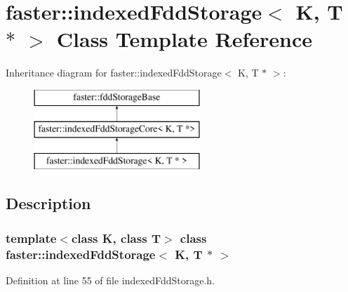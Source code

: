 \hypertarget{classfaster_1_1indexedFddStorage_3_01K_00_01T_01_5_01_4}{}\section{faster\+:\+:indexed\+Fdd\+Storage$<$ K, T $\ast$ $>$ Class Template Reference}
\label{classfaster_1_1indexedFddStorage_3_01K_00_01T_01_5_01_4}
Inheritance diagram for faster\+:\+:indexed\+Fdd\+Storage$<$ K, T $\ast$ $>$\+:\begin{figure}[H]
\begin{center}
\leavevmode
\includegraphics[height=3.000000cm]{classfaster_1_1indexedFddStorage_3_01K_00_01T_01_5_01_4}
\end{center}
\end{figure}


\subsection{Description}
\subsubsection*{template$<$class K, class T$>$\newline
class faster\+::indexed\+Fdd\+Storage$<$ K, T $\ast$ $>$}



Definition at line 55 of file indexed\+Fdd\+Storage.\+h.

